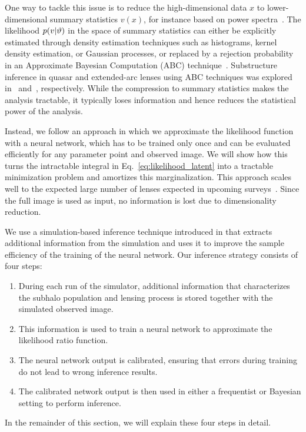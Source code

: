 \documentclass[twocolumn]{aastex62}
\begin{document}
One way to tackle this issue is to reduce the high-dimensional data $x$ to lower-dimensional summary statistics $v(x)$, for instance based on power spectra~\citep{1403.2720,1809.00004,1707.04590,1806.07897,1808.03501,1710.03075,1506.01724}. The likelihood $p(v|\vartheta)$ in the space of summary statistics can either be explicitly estimated through density estimation techniques such as histograms, kernel density estimation, or Gaussian processes, or replaced by a rejection probability in an Approximate Bayesian Computation (ABC) technique~\citep{rubin1984}. Substructure inference in quasar and extended-arc lenses using ABC techniques was explored in~\citet{1712.04945} and~\citet{1702.00009}, respectively. While the compression to summary statistics makes the analysis tractable, it typically loses information and hence reduces the statistical power of the analysis.

Instead, we follow an approach in which we approximate the likelihood function with a neural network, which has to be trained only once and can be evaluated efficiently for any parameter point and observed image.
We will show how this turns the intractable integral in Eq.~\eqref{eq:likelihood_latent} into a tractable minimization problem and amortizes this marginalization. This approach scales well to the expected large number of lenses expected in upcoming surveys~\citep{2015ApJ...811...20C,1001.2037,1003.5567}. Since the full image is used as input, no information is lost due to dimensionality reduction.

We use a simulation-based inference technique introduced in \citet{1805.00013,1805.00020,1805.12244} that extracts additional information from the simulation and uses it to improve the sample efficiency of the training of the neural network. Our inference strategy consists of four steps:
%
\begin{enumerate}
  \item During each run of the simulator, additional information that characterizes the subhalo population and lensing process is stored together with the simulated observed image.
  \item This information is used to train a neural network to approximate the likelihood ratio function.
  \item The neural network output is calibrated, ensuring that errors during training do not lead to wrong inference results.
  \item The calibrated network output is then used in either a frequentist or Bayesian setting to perform inference.
\end{enumerate}
%
In the remainder of this section, we will explain these four steps in detail.
\end{document}

